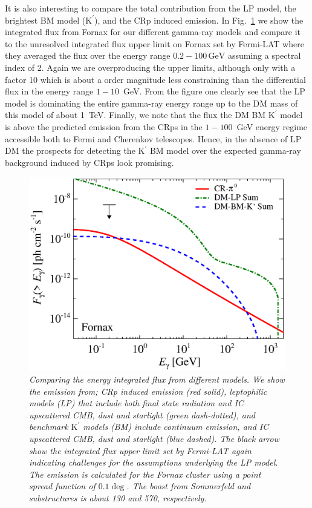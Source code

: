 \documentclass[10pt,aps,pra,reprint,amsmath,amsfonts,amssymb,showpacs,nofootinbib,floatfix]{revtex4-1}
\newcommand{\rmn}{\mathrm}
\newcommand{\Kp}{\rmn{K}^\prime}
\newcommand{\gev}{\rmn{GeV}}
\begin{document}
It is also interesting to compare the total contribution from the LP
model, the brightest BM model ($\Kp$), and the CRp induced
emission. In Fig.~\ref{fig:flux_int} we show the integrated flux from
Fornax for our different gamma-ray models and compare it to the
unresolved integrated flux upper limit on Fornax set by Fermi-LAT
where they averaged the flux over the energy range $0.2-100\,\gev$
assuming a spectral index of 2. Again we are overproducing the upper
limits, although only with a factor 10 which is about a order
magnitude less constraining than the differential flux in the energy
range $1-10$~GeV. From the figure one clearly see that the LP model is
dominating the entire gamma-ray energy range up to the DM mass of this
model of about 1~TeV. Finally, we note that the flux the DM BM $\Kp$
model is above the predicted emission from the CRps in the $1-100$~GeV
energy regime accessible both to Fermi and Cherenkov
telescopes. Hence, in the absence of LP DM the prospects for detecting
the $\Kp$ BM model over the expected gamma-ray background induced by
CRps look promising.

\begin{figure}
 \includegraphics[width=0.99\columnwidth]{figures/flux.int.v11.0.1deg.1.6T.SubMass.SF300.IR2.noMW.woGal.eps}
 \caption{\it Comparing the energy integrated flux from different
   models. We show the emission from; CRp induced emission (red
   solid), leptophilic models (LP) that include both final state
   radiation and IC upscattered CMB, dust and starlight (green
   dash-dotted), and benchmark $\Kp$ models (BM) include continuum
   emission, and IC upscattered CMB, dust and starlight (blue
   dashed). The black arrow show the integrated flux upper limit set
   by Fermi-LAT again indicating challenges for the assumptions
   underlying the LP model. The emission is calculated for the Fornax
   cluster using a point spread function of $0.1\deg$. The boost from
   Sommerfeld and substructures is about 130 and 570, respectively. }
 \label{fig:flux_int}
\end{figure}
\end{document}
